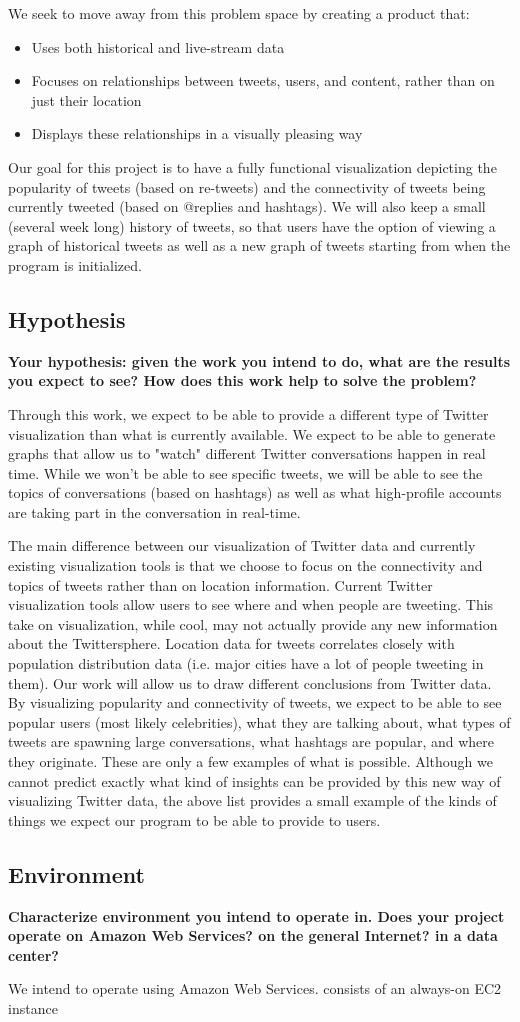 We seek to move away from this problem space by creating a product that:
\begin{itemize}[noitemsep]
\item Uses both historical and live-stream data
\item Focuses on relationships between tweets, users, and content, rather than on just their location
\item Displays these relationships in a visually pleasing way
\end{itemize}

Our goal for this project is to have a fully functional visualization depicting the popularity of tweets (based on
re-tweets) and the connectivity of tweets being currently tweeted (based on @replies and hashtags). We will also keep a
small (several week long) history of tweets, so that users have the option of viewing a graph of historical tweets as
well as a new graph of tweets starting from when the program is initialized.

\subsection{Hypothesis}
\textbf{Your hypothesis: given the work you intend to do, what are the results you expect to see? How does this work help to solve the problem?}

Through this work, we expect to be able to provide a different type of Twitter visualization than what is currently available.
We expect to be able to generate graphs that allow us to "watch" different Twitter conversations happen in real time. While
we won't be able to see specific tweets, we will be able to see the topics of conversations (based on hashtags) as well as
what high-profile accounts are taking part in the conversation in real-time.

The main difference between our visualization of Twitter data and currently existing visualization tools is that we choose
to focus on the connectivity and topics of tweets rather than on location information. Current Twitter visualization tools
allow users to see where and when people are tweeting. This take on visualization, while cool, may not actually provide
any new information about the Twittersphere. Location data for tweets correlates closely with population distribution data (i.e.
major cities have a lot of people tweeting in them). Our work will allow us to draw different conclusions from Twitter
data. By visualizing popularity and connectivity of tweets, we expect to be able to see popular users (most likely
celebrities), what they are talking about, what types of tweets are spawning large conversations, what hashtags are
popular, and where they originate. These are only a few examples of what is possible. Although we cannot predict exactly
what kind of insights can be provided by this new way of visualizing Twitter data, the above list provides a small example
of the kinds of things we expect our program to be able to provide to users.

\subsection{Environment}
\textbf{Characterize environment you intend to operate in. Does your project operate on Amazon Web Services? on the general Internet? in a data center?}

We intend to operate using Amazon Web Services. \sys consists of an always-on EC2 instance
